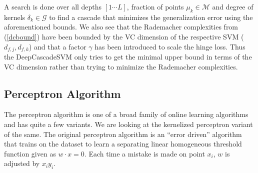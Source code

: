 \documentclass[paper=letter, fontsize=11pt]{scrartcl}
\numberwithin{equation}{section}		%
\numberwithin{figure}{section}			%
\numberwithin{table}{section}				%
\begin{document}
A search is done over all depths $[1 \cdots L]$, fraction of points $\mu_k \in \mathcal{M}$ and degree of kernels $\delta_k \in \mathcal{G}$ to find a cascade that minimizes the generalization error using the aforementioned bounds. We also see that the Rademacher complexities from (\ref{dcbound}) have been bounded by the VC dimension of the respective SVM ($d_{f,j},d_{f,k}$) and that a factor $\gamma$ has been introduced to scale the hinge loss. Thus the DeepCascadeSVM only tries to get the minimal upper bound  in terms of the VC dimension rather than trying to minimize the Rademacher complexities.


\subsection{Perceptron Algorithm}
The perceptron algorithm is one of a broad family of online learning algorithms and has quite a few variants. We are looking at the kernelized perceptron variant of the same. The original perceptron algorithm is an ``error driven'' algorithm that trains on the dataset to learn a separating linear homogeneous threshold function given as $w \cdot x=0$. Each time a mistake is made on point $x_i$, $w$ is adjusted by $x_iy_i$. 
\end{document}
